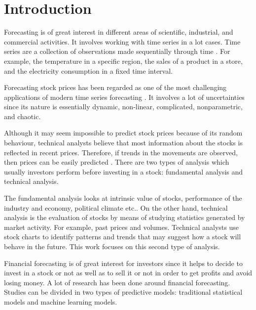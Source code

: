\chapter{Introduction}
\label{ch:introsm}



Forecasting is of great interest in different areas of scientific, industrial, and commercial activities. It involves working with time series in a lot cases. Time series are a collection of observations made sequentially through time \cite{chatfield2000time}. For example, the temperature in a specific region, the sales of a product in a store, and the electricity consumption in a fixed time interval.

Forecasting stock prices has been regarded as one of the most challenging applications of modern time series forecasting \cite{pai2005hybrid}. It involves a lot of uncertainties since its nature is essentially dynamic, non-linear, complicated, nonparametric, and chaotic.

Although it may seem impossible to predict stock prices because of its random behaviour, technical analysts believe that most information about the stocks is reflected in recent prices. Therefore, if trends in the movements are observed, then prices can be easily predicted \cite{patel2015predicting}. There are two types of analysis which usually investors perform before investing in a stock: fundamental analysis and technical analysis.

The fundamental analysis looks at intrinsic value of stocks, performance of the industry and economy, political climate etc.. On the other hand, technical analysis is the evaluation of stocks by means of studying statistics generated by market activity. For example, past prices and volumes. Technical analysts use stock charts to identify patterns and trends that may suggest how a stock will behave in the future\cite{patel2015predicting}. This work focuses on this second type of analysis.

Financial forecasting is of great interest for investors since it helps to decide to invest in a stock or not as well as to sell it or not in order to get profits and avoid losing money. A lot of research has been done around financial forecasting. Studies can be divided in two types of predictive models: traditional statistical models and machine learning models.

